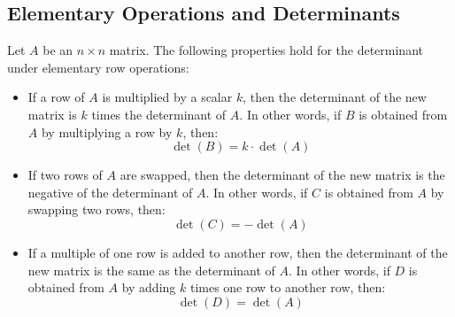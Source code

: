 \subsection{Elementary Operations and Determinants}
\begin{theorem}
    Let $A$ be an \(n \times n\) matrix. The following properties hold for the determinant under elementary row operations:
    \begin{itemize}[itemsep=1pt,label=$\circ$]
        \item If a row of $A$ is multiplied by a scalar \(k\), then the determinant of the new matrix is \(k\) times the determinant of $A$. In other words, if \(B\) is obtained from \(A\) by multiplying a row by \(k\), then:
        \[
            \det(B) = k \cdot \det(A)
        \]
        \item If two rows of $A$ are swapped, then the determinant of the new matrix is the negative of the determinant of $A$. In other words, if \(C\) is obtained from \(A\) by swapping two rows, then:
        \[
            \det(C) = -\det(A)
        \]
        \item If a multiple of one row is added to another row, then the determinant of the new matrix is the same as the determinant of $A$. In other words, if \(D\) is obtained from \(A\) by adding \(k\) times one row to another row, then:
        \[
            \det(D) = \det(A)
        \]
    \end{itemize}
\end{theorem}
